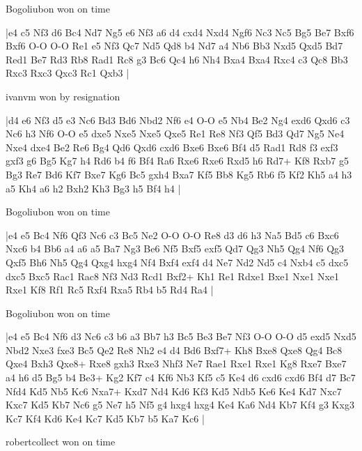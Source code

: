 \showboard

Bogoliubon won on time

\makegametitle
|e4 c5 Nf3 d6 Bc4 Nd7 Ng5 e6 Nf3 a6 d4 cxd4 Nxd4 Ngf6 Nc3 Nc5 Bg5 Be7 Bxf6 Bxf6 O-O O-O Re1 e5 Nf3 Qc7 Nd5 Qd8 b4 Nd7 a4 Nb6 Bb3 Nxd5 Qxd5 Bd7 Red1 Be7 Rd3 Rb8 Rad1 Rc8 g3 Bc6 Qc4 h6 Nh4 Bxa4 Bxa4 Rxc4 c3 Qc8 Bb3 Rxc3 Rxc3 Qxc3 Rc1 Qxb3  |

\showboard

ivanvm won by resignation

\makegametitle
|d4 e6 Nf3 d5 e3 Nc6 Bd3 Bd6 Nbd2 Nf6 e4 O-O e5 Nb4 Be2 Ng4 exd6 Qxd6 c3 Nc6 h3 Nf6 O-O e5 dxe5 Nxe5 Nxe5 Qxe5 Re1 Re8 Nf3 Qf5 Bd3 Qd7 Ng5 Ne4 Nxe4 dxe4 Be2 Re6 Bg4 Qd6 Qxd6 cxd6 Bxe6 Bxe6 Bf4 d5 Rad1 Rd8 f3 exf3 gxf3 g6 Bg5 Kg7 h4 Rd6 b4 f6 Bf4 Ra6 Rxe6 Rxe6 Rxd5 h6 Rd7+ Kf8 Rxb7 g5 Bg3 Re7 Bd6 Kf7 Bxe7 Kg6 Bc5 gxh4 Bxa7 Kf5 Bb8 Kg5 Rb6 f5 Kf2 Kh5 a4 h3 a5 Kh4 a6 h2 Bxh2 Kh3 Bg3 h5 Bf4 h4  |

\showboard

Bogoliubon won on time

\makegametitle
|e4 e5 Bc4 Nf6 Qf3 Nc6 c3 Bc5 Ne2 O-O O-O Re8 d3 d6 h3 Na5 Bd5 c6 Bxc6 Nxc6 b4 Bb6 a4 a6 a5 Ba7 Ng3 Be6 Nf5 Bxf5 exf5 Qd7 Qg3 Nh5 Qg4 Nf6 Qg3 Qxf5 Bh6 Nh5 Qg4 Qxg4 hxg4 Nf4 Bxf4 exf4 d4 Ne7 Nd2 Nd5 c4 Nxb4 c5 dxc5 dxc5 Bxc5 Rac1 Rac8 Nf3 Nd3 Rcd1 Bxf2+ Kh1 Re1 Rdxe1 Bxe1 Nxe1 Nxe1 Rxe1 Kf8 Rf1 Rc5 Rxf4 Rxa5 Rb4 b5 Rd4 Ra4  |

\showboard

Bogoliubon won on time

\makegametitle
|e4 e5 Bc4 Nf6 d3 Nc6 c3 b6 a3 Bb7 h3 Bc5 Be3 Be7 Nf3 O-O O-O d5 exd5 Nxd5 Nbd2 Nxe3 fxe3 Bc5 Qe2 Re8 Nh2 e4 d4 Bd6 Bxf7+ Kh8 Bxe8 Qxe8 Qg4 Bc8 Qxe4 Bxh3 Qxe8+ Rxe8 gxh3 Rxe3 Nhf3 Ne7 Rae1 Rxe1 Rxe1 Kg8 Rxe7 Bxe7 a4 h6 d5 Bg5 b4 Be3+ Kg2 Kf7 c4 Kf6 Nb3 Kf5 c5 Ke4 d6 cxd6 cxd6 Bf4 d7 Bc7 Nfd4 Kd5 Nb5 Kc6 Nxa7+ Kxd7 Nd4 Kd6 Kf3 Kd5 Ndb5 Ke6 Ke4 Kd7 Nxc7 Kxc7 Kd5 Kb7 Nc6 g5 Ne7 h5 Nf5 g4 hxg4 hxg4 Ke4 Ka6 Nd4 Kb7 Kf4 g3 Kxg3 Kc7 Kf4 Kd6 Ke4 Kc7 Kd5 Kb7 b5 Ka7 Kc6  |

\showboard

robertcollect won on time

